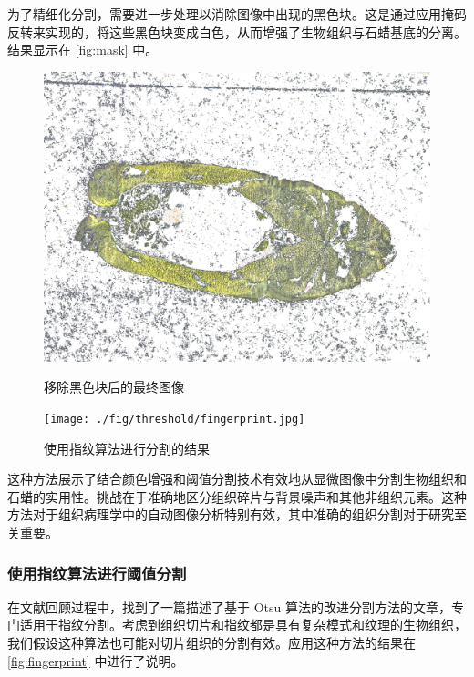 为了精细化分割，需要进一步处理以消除图像中出现的黑色块。这是通过应用掩码反转来实现的，将这些黑色块变成白色，从而增强了生物组织与石蜡基底的分离。结果显示在 \autoref{fig:mask} 中。

\begin{figure}[H]
    \centering
    \begin{minipage}{0.45\textwidth}
        \centering
        \includegraphics[width=\textwidth]{./fig/threshold/final.jpg}
        \caption{移除黑色块后的最终图像}
        \label{fig:mask}
    \end{minipage}
    \begin{minipage}{0.45\textwidth}
        \centering
        \texttt{[image: ./fig/threshold/fingerprint.jpg]}
        \caption{使用指纹算法进行分割的结果}
        \label{fig:fingerprint}
    \end{minipage}
\end{figure}

这种方法展示了结合颜色增强和阈值分割技术有效地从显微图像中分割生物组织和石蜡的实用性。挑战在于准确地区分组织碎片与背景噪声和其他非组织元素。这种方法对于组织病理学中的自动图像分析特别有效，其中准确的组织分割对于研究至关重要。

\subsubsection{使用指纹算法进行阈值分割}
在文献回顾过程中，找到了一篇描述了基于 Otsu 算法的改进分割方法的文章，专门适用于指纹分割。考虑到组织切片和指纹都是具有复杂模式和纹理的生物组织，我们假设这种算法也可能对切片组织的分割有效。应用这种方法的结果在 \autoref{fig:fingerprint} 中进行了说明。

